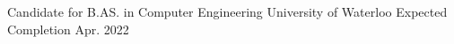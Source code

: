 

\begin{cventries}

  \cventry
    {Candidate for B.AS. in Computer Engineering} %
    {University of Waterloo} %
    {} %
    {Expected Completion Apr. 2022} %
    {}

\end{cventries}
